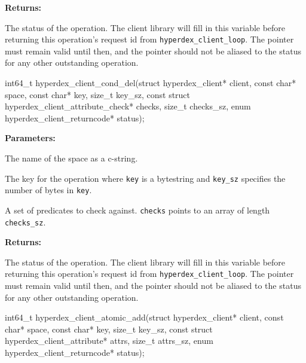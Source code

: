 \noindent\textbf{Returns:}
\begin{description}[labelindent=\widthof{{\texttt{status}}},leftmargin=*,noitemsep,nolistsep,align=right]
\item[\texttt{status}] The status of the operation.  The client library will fill in this variable before returning this operation's request id from \texttt{hyperdex\_client\_loop}.  The pointer must remain valid until then, and the pointer should not be aliased to the status for any other outstanding operation.
\end{description}

\funcsep
\begin{ccode}
int64_t hyperdex_client_cond_del(struct hyperdex_client* client,
                const char* space,
                const char* key, size_t key_sz,
                const struct hyperdex_client_attribute_check* checks, size_t checks_sz,
                enum hyperdex_client_returncode* status);
\end{ccode}
\funcdesc 

\noindent\textbf{Parameters:}
\begin{description}[labelindent=\widthof{{\texttt{checks}, \texttt{checks\_sz}}},leftmargin=*,noitemsep,nolistsep,align=right]
\item[\texttt{space}] The name of the space as a c-string.
\item[\texttt{key}, \texttt{key\_sz}] The key for the operation where \texttt{key} is a bytestring and \texttt{key\_sz} specifies the number of bytes in \texttt{key}.
\item[\texttt{checks}, \texttt{checks\_sz}] A set of predicates to check against.  \texttt{checks} points to an array of length \texttt{checks\_sz}.
\end{description}

\noindent\textbf{Returns:}
\begin{description}[labelindent=\widthof{{\texttt{status}}},leftmargin=*,noitemsep,nolistsep,align=right]
\item[\texttt{status}] The status of the operation.  The client library will fill in this variable before returning this operation's request id from \texttt{hyperdex\_client\_loop}.  The pointer must remain valid until then, and the pointer should not be aliased to the status for any other outstanding operation.
\end{description}

\funcsep
\begin{ccode}
int64_t hyperdex_client_atomic_add(struct hyperdex_client* client,
                const char* space,
                const char* key, size_t key_sz,
                const struct hyperdex_client_attribute* attrs, size_t attrs_sz,
                enum hyperdex_client_returncode* status);
\end{ccode}
\funcdesc 

